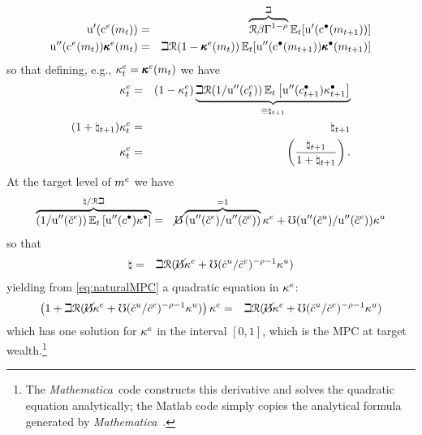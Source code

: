 \documentclass{handout}
\begin{document}
\begin{eqnarray}
  {\ensuremath{\mathrm{u}^{\prime}}}(\mathrm{c}^{e}(m_{t})) & = & \overbrace{\mathcal{R} \beta \Gamma^{1-\rho}}^{\beth} \operatorname{\mathbb{E}}_{t}[{\mathrm{u}^{\prime}}(\mathrm{c}^{\bullet}(m_{t+1}))]
\\  {\mathrm{u}}^{\prime\prime}(\mathrm{c}^{e}(m_{t}))\pmb{\kappa}^{e}(m_{t}) & = & \beth  \mathcal{R} (1-\pmb{\kappa}^{e}(m_{t}))\operatorname{\mathbb{E}}_{t}[{\mathrm{u}}^{\prime\prime}(\mathrm{c}^{\bullet}(m_{t+1}))\pmb{\kappa}^{\bullet}(m_{t+1})] \label{eq:dEuler}
\end{eqnarray}
so that defining, e.g., $\kappa^{e}_{t} = \pmb{\kappa}^{e}(m_{t})$ we have 
\begin{eqnarray}
 \kappa^{e}_{t} & = &  (1-\kappa^{e}_{t}) \underbrace{\beth \mathcal{R} (1/{\mathrm{u}^{\prime\prime}}(c^{e}_{t}))\operatorname{\mathbb{E}}_{t}\left[{\mathrm{u}^{\prime\prime}}(c^{\bullet}_{t+1})\kappa^{\bullet}_{t+1}\right]}_{\equiv \natural_{t+1}} \label{eq:natural}
\\ (1+\natural_{t+1})\kappa^{e}_{t} & = & \natural_{t+1} \label{eq:naturalMPC}
\\ \kappa^{e}_{t} & = & \left(\frac{\natural_{t+1}}{1+\natural_{t+1}}\right) \label{eq:naturalSolved}
.
\end{eqnarray}
\newcommand{\Mma}{{\it Mathematica}~}
At the target level of $m^{e}$ we have 
\begin{eqnarray*}
  \overbrace{(1/{\mathrm{u}^{\prime\prime}}(\check{c}^{e}))\operatorname{\mathbb{E}}_{t}\left[{\mathrm{u}^{\prime\prime}}(c^{\bullet})\kappa^{\bullet}\right]}^{\natural / \mathcal{R} \beth} & = & \cancel{\mho} \overbrace{({\mathrm{u}^{\prime\prime}}(\check{c}^{e})/{\mathrm{u}^{\prime\prime}}(\check{c}^{e}))}^{=1}\kappa^{e}+\mho ({\mathrm{u}^{\prime\prime}}(\check{c}^{u})/{\mathrm{u}^{\prime\prime}}(\check{c}^{e}))\kappa^{u}
\end{eqnarray*}
so that 
\begin{eqnarray}
  \natural & = &  \beth \mathcal{R} (\cancel{\mho} \kappa^{e} + \mho (\check{c}^{u}/\check{c}^{e})^{-\rho-1} \kappa^{u})
\end{eqnarray}
yielding from \eqref{eq:naturalMPC} a quadratic equation in $\kappa^{e}$:
\begin{eqnarray}
  \left(1+\beth \mathcal{R} (\cancel{\mho} \kappa^{e} + \mho (\check{c}^{u}/\check{c}^{e})^{-\rho-1}  \kappa^{u}) \right)\kappa^{e} & = & \beth \mathcal{R} (\cancel{\mho} \kappa^{e} + \mho (\check{c}^{u}/\check{c}^{e})^{-\rho-1} \kappa^{u}) \label{eq:quadraticForTargetMPC}
\end{eqnarray} 
which has one solution for $\kappa^{e}$ in the interval $[0,1]$, which is the MPC at target wealth.\footnote{The 
\Mma code constructs this derivative and solves the quadratic equation analytically; the Matlab code simply copies
the analytical formula generated by \Mma.}
\end{document}
